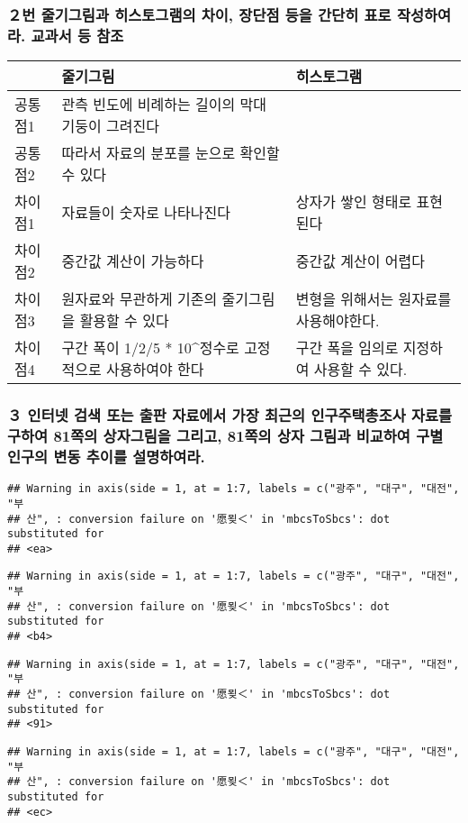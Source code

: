 \documentclass[]{article}
\begin{document}
\subsubsection{２번 줄기그림과 히스토그램의 차이, 장단점 등을 간단히
표로 작성하여라. 교과서 등 참조}\label{--------.---}

\begin{longtable}[]{@{}lll@{}}
\toprule
& 줄기그림 & 히스토그램\tabularnewline
\midrule
\endhead
공통점1 & 관측 빈도에 비례하는 길이의 막대 기둥이 그려진다
&\tabularnewline
공통점2 & 따라서 자료의 분포를 눈으로 확인할 수 있다 &\tabularnewline
차이점1 & 자료들이 숫자로 나타나진다 & 상자가 쌓인 형태로
표현된다\tabularnewline
차이점2 & 중간값 계산이 가능하다 & 중간값 계산이 어렵다\tabularnewline
차이점3 & 원자료와 무관하게 기존의 줄기그림을 활용할 수 있다 & 변형을
위해서는 원자료를 사용해야한다.\tabularnewline
차이점4 & 구간 폭이 1/2/5 * 10\^{}정수로 고정적으로 사용하여야 한다 &
구간 폭을 임의로 지정하여 사용할 수 있다.\tabularnewline
\bottomrule
\end{longtable}

\subsubsection{３ 인터넷 검색 또는 출판 자료에서 가장 최근의
인구주택총조사 자료를 구하여 81쪽의 상자그림을 그리고, 81쪽의 상자
그림과 비교하여 구별 인구의 변동 추이를
설명하여라.}\label{----------81---81--------.}

\begin{verbatim}
## Warning in axis(side = 1, at = 1:7, labels = c("광주", "대구", "대전", "부
## 산", : conversion failure on '愿묒＜' in 'mbcsToSbcs': dot substituted for
## <ea>
\end{verbatim}

\begin{verbatim}
## Warning in axis(side = 1, at = 1:7, labels = c("광주", "대구", "대전", "부
## 산", : conversion failure on '愿묒＜' in 'mbcsToSbcs': dot substituted for
## <b4>
\end{verbatim}

\begin{verbatim}
## Warning in axis(side = 1, at = 1:7, labels = c("광주", "대구", "대전", "부
## 산", : conversion failure on '愿묒＜' in 'mbcsToSbcs': dot substituted for
## <91>
\end{verbatim}

\begin{verbatim}
## Warning in axis(side = 1, at = 1:7, labels = c("광주", "대구", "대전", "부
## 산", : conversion failure on '愿묒＜' in 'mbcsToSbcs': dot substituted for
## <ec>
\end{verbatim}
\end{document}
